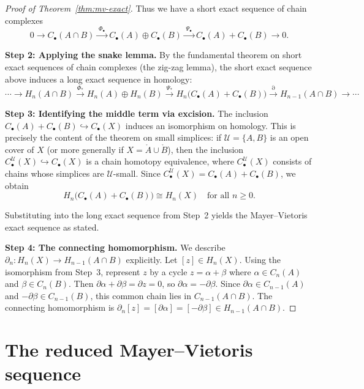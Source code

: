 \documentclass[12pt,a4paper,openany]{book}
\theoremstyle{definition}
\theoremstyle{plain}
\theoremstyle{remark}
\begin{document}
\begin{proof}[Proof of Theorem~\ref{thm:mv-exact}]
Thus we have a short exact sequence of chain complexes
\[
0 \longrightarrow C_\bullet(A\cap B) \xrightarrow{\;\Phi_\bullet\;}
C_\bullet(A)\oplus C_\bullet(B) \xrightarrow{\;\Psi_\bullet\;}
C_\bullet(A)+C_\bullet(B) \longrightarrow 0.
\]

\textbf{Step 2: Applying the snake lemma.}
By the fundamental theorem on short exact sequences of chain complexes
(the zig-zag lemma), the short exact sequence above induces a long
exact sequence in homology:
\[
\cdots \to H_n(A\cap B) \xrightarrow{\Phi_*}
H_n(A)\oplus H_n(B) \xrightarrow{\Psi_*}
H_n\bigl(C_\bullet(A)+C_\bullet(B)\bigr) \xrightarrow{\partial}
H_{n-1}(A\cap B) \to \cdots
\]

\textbf{Step 3: Identifying the middle term via excision.}
The inclusion $C_\bullet(A)+C_\bullet(B)\hookrightarrow C_\bullet(X)$
induces an isomorphism on homology. This is precisely the content of
the theorem on small simplices: if $\mathcal{U}=\{A,B\}$ is an open
cover of $X$ (or more generally if $X=\mathring{A}\cup\mathring{B}$),
then the inclusion $C_\bullet^{\mathcal{U}}(X)\hookrightarrow C_\bullet(X)$
is a chain homotopy equivalence, where $C_\bullet^{\mathcal{U}}(X)$
consists of chains whose simplices are $\mathcal{U}$-small. Since
$C_\bullet^{\mathcal{U}}(X) = C_\bullet(A)+C_\bullet(B)$, we obtain
\[
  H_n\bigl(C_\bullet(A)+C_\bullet(B)\bigr) \cong H_n(X)
  \quad\text{for all } n\geq 0.
\]

Substituting into the long exact sequence from Step~2 yields the
Mayer--Vietoris exact sequence as stated.

\textbf{Step 4: The connecting homomorphism.}
We describe $\partial_n\colon H_n(X)\to H_{n-1}(A\cap B)$ explicitly.
Let $[z]\in H_n(X)$. Using the isomorphism from Step~3, represent $z$
by a cycle $z=\alpha+\beta$ where $\alpha\in C_n(A)$ and $\beta\in C_n(B)$.
Then $\partial\alpha+\partial\beta=\partial z=0$, so
$\partial\alpha = -\partial\beta$. Since $\partial\alpha\in C_{n-1}(A)$
and $-\partial\beta\in C_{n-1}(B)$, this common chain lies in
$C_{n-1}(A\cap B)$. The connecting homomorphism is
$\partial_n[z] = [\partial\alpha] = [-\partial\beta] \in H_{n-1}(A\cap B)$.
\end{proof}

\section{The reduced Mayer--Vietoris sequence}
\label{sec:mv-reduced}
\end{document}
